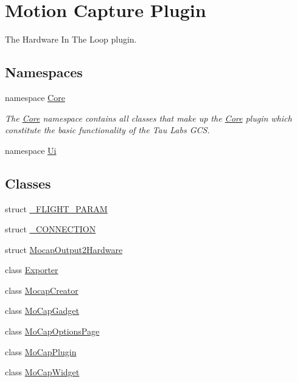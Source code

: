 \hypertarget{group___mo_cap_plugin}{\section{Motion Capture Plugin}
\label{group___mo_cap_plugin}
}


The Hardware In The Loop plugin.  


\subsection*{Namespaces}
\begin{DoxyCompactItemize}
\item 
namespace \hyperlink{namespace_core}{Core}
\begin{DoxyCompactList}\small\item\em The \hyperlink{namespace_core}{Core} namespace contains all classes that make up the \hyperlink{namespace_core}{Core} plugin which constitute the basic functionality of the Tau Labs G\-C\-S. \end{DoxyCompactList}\item 
namespace \hyperlink{namespace_ui}{Ui}
\end{DoxyCompactItemize}
\subsection*{Classes}
\begin{DoxyCompactItemize}
\item 
struct \hyperlink{struct___f_l_i_g_h_t___p_a_r_a_m}{\-\_\-\-F\-L\-I\-G\-H\-T\-\_\-\-P\-A\-R\-A\-M}
\item 
struct \hyperlink{struct___c_o_n_n_e_c_t_i_o_n}{\-\_\-\-C\-O\-N\-N\-E\-C\-T\-I\-O\-N}
\item 
struct \hyperlink{struct_mocap_output2_hardware}{Mocap\-Output2\-Hardware}
\item 
class \hyperlink{class_exporter}{Exporter}
\item 
class \hyperlink{class_mocap_creator}{Mocap\-Creator}
\item 
class \hyperlink{class_mo_cap_gadget}{Mo\-Cap\-Gadget}
\item 
class \hyperlink{class_mo_cap_options_page}{Mo\-Cap\-Options\-Page}
\item 
class \hyperlink{class_mo_cap_plugin}{Mo\-Cap\-Plugin}
\item 
class \hyperlink{class_mo_cap_widget}{Mo\-Cap\-Widget}
\end{DoxyCompactItemize}
